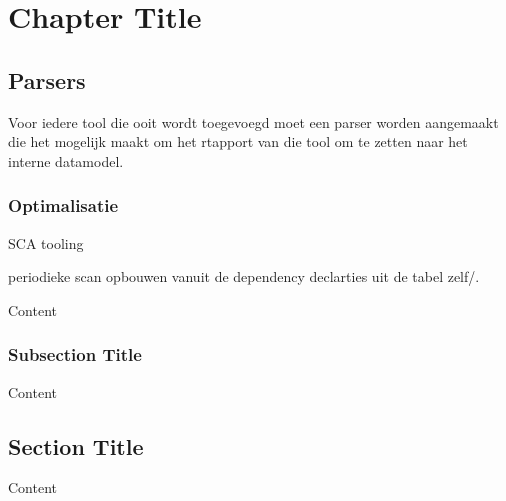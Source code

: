
\chapter{Chapter Title}\label{ch:name} %


\section{Parsers}\label{sec:parsers}
Voor iedere tool die ooit wordt toegevoegd moet een parser worden aangemaakt die het mogelijk maakt om het rtapport van die tool om te zetten naar het interne datamodel.




\subsection{Optimalisatie}

SCA tooling

periodieke scan opbouwen vanuit de dependency declarties uit de tabel zelf/.

Content


\subsection{Subsection Title}

Content


\section{Section Title}

Content
